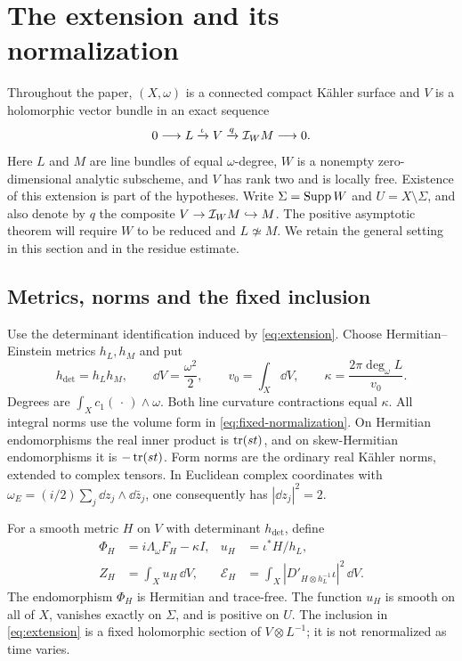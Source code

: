 \section{The extension and its normalization}\label{sec:geometry}

Throughout the paper, $(X,\omega)$ is a connected compact K\"ahler
surface and $V$ is a holomorphic vector bundle in an exact sequence
\begin{equation}\label{eq:extension}
 0\longrightarrow L\xrightarrow{\iota}V
       \xrightarrow{q}\mathcal I_WM\longrightarrow0.
\end{equation}
Here $L$ and $M$ are line bundles of equal $\omega$-degree,
$W$ is a nonempty zero-dimensional analytic subscheme, and $V$
has rank two and is locally free. Existence of this extension is
part of the hypotheses. Write $\Sigma=\operatorname{Supp} W$ and
$U=X\setminus\Sigma$, and also denote by $q$ the composite
$V\to\mathcal I_WM\hookrightarrow M$.
The positive asymptotic theorem will require $W$ to be reduced
and $L\not\simeq M$. We retain the general setting in this section
and in the residue estimate.

\subsection{Metrics, norms and the fixed inclusion}

Use the determinant identification induced by \eqref{eq:extension}.
Choose Hermitian--Einstein metrics $h_L,h_M$ and put
\begin{equation}\label{eq:fixed-normalization}
 h_{\det}=h_Lh_M,\qquad
 \dd V=\frac{\omega^2}{2},\qquad
 v_0=\int_X\dd V,\qquad
 \kappa=\frac{2\pi\deg_\omega L}{v_0}.
\end{equation}
Degrees are $\int_Xc_1(\,\cdot\,)\wedge\omega$.
Both line curvature contractions equal $\kappa$.
All integral norms use the volume form in
\eqref{eq:fixed-normalization}. On Hermitian endomorphisms the
real inner product is $\operatorname{tr}(st)$, and on skew-Hermitian
endomorphisms it is $-\operatorname{tr}(st)$. Form norms are the ordinary real
K\"ahler norms, extended to complex tensors. In Euclidean complex
coordinates with $\omega_E=(i/2)\sum_j\dd z_j\wedge\dd\bar z_j$,
one consequently has $|\dd z_j|^2=2$.

For a smooth metric $H$ on $V$ with determinant $h_{\det}$, define
\begin{equation}\label{eq:observables}
 \begin{aligned}
 \Phi_H&=i\Lambda_\omega F_H-\kappa I,&
 u_H&=\iota^*H/h_L,\\
 Z_H&=\int_Xu_H\,\dd V,&
 \mathcal E_H&=\int_X
       |D'_{H\otimes h_L^{-1}}\iota|^2\,\dd V .
 \end{aligned}
\end{equation}
The endomorphism $\Phi_H$ is Hermitian and trace-free.
The function $u_H$ is smooth on all of $X$, vanishes exactly on
$\Sigma$, and is positive on $U$. The inclusion in
\eqref{eq:extension} is a fixed holomorphic section of
$V\otimes L^{-1}$; it is not renormalized as time varies.

